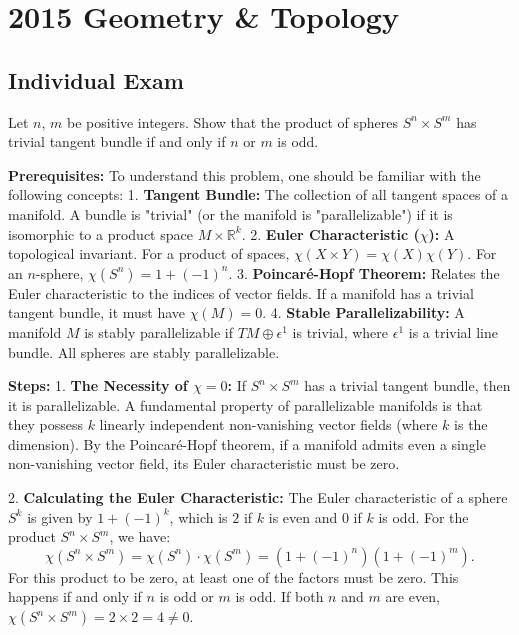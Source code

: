 \section{2015 Geometry \& Topology}

\subsection{Individual Exam}

\begin{exercise}
\label{geometry:2015:1}
Let $n$, $m$ be positive integers. Show that the product of spheres $S^{n} \times S^{m}$ has trivial tangent bundle if and only if $n$ or $m$ is odd.
\end{exercise}

\begin{solution}
\textbf{Prerequisites:}
To understand this problem, one should be familiar with the following concepts:
1. \textbf{Tangent Bundle:} The collection of all tangent spaces of a manifold. A bundle is "trivial" (or the manifold is "parallelizable") if it is isomorphic to a product space $M \times \mathbb{R}^k$.
2. \textbf{Euler Characteristic ($\chi$):} A topological invariant. For a product of spaces, $\chi(X \times Y) = \chi(X)\chi(Y)$. For an $n$-sphere, $\chi(S^n) = 1 + (-1)^n$.
3. \textbf{Poincaré-Hopf Theorem:} Relates the Euler characteristic to the indices of vector fields. If a manifold has a trivial tangent bundle, it must have $\chi(M) = 0$.
4. \textbf{Stable Parallelizability:} A manifold $M$ is stably parallelizable if $TM \oplus \epsilon^1$ is trivial, where $\epsilon^1$ is a trivial line bundle. All spheres are stably parallelizable.
\par\vspace{\baselineskip}

\textbf{Steps:}
1. \textbf{The Necessity of $\chi = 0$:}
If $S^n \times S^m$ has a trivial tangent bundle, then it is parallelizable. A fundamental property of parallelizable manifolds is that they possess $k$ linearly independent non-vanishing vector fields (where $k$ is the dimension). By the Poincaré-Hopf theorem, if a manifold admits even a single non-vanishing vector field, its Euler characteristic must be zero.
\par\vspace{\baselineskip}

2. \textbf{Calculating the Euler Characteristic:}
The Euler characteristic of a sphere $S^k$ is given by $1 + (-1)^k$, which is $2$ if $k$ is even and $0$ if $k$ is odd. For the product $S^n \times S^m$, we have:
\[ \chi(S^n \times S^m) = \chi(S^n) \cdot \chi(S^m) = (1 + (-1)^n)(1 + (-1)^m). \]
For this product to be zero, at least one of the factors must be zero. This happens if and only if $n$ is odd or $m$ is odd. If both $n$ and $m$ are even, $\chi(S^n \times S^m) = 2 \times 2 = 4 \neq 0$.
\par\vspace{\baselineskip}


\end{solution}
